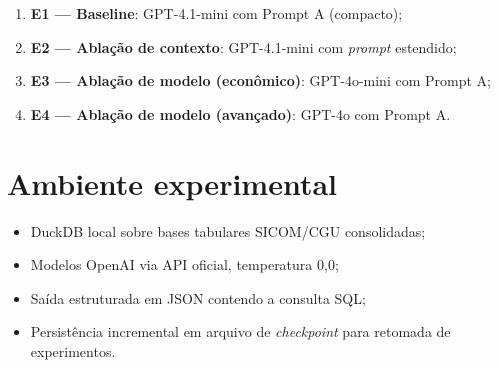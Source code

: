 \begin{enumerate}
    \item \textbf{E1 --- Baseline}: GPT-4.1-mini com Prompt A (compacto);
    \item \textbf{E2 --- Ablação de contexto}: GPT-4.1-mini com \textit{prompt} estendido;
    \item \textbf{E3 --- Ablação de modelo (econômico)}: GPT-4o-mini com Prompt A;
    \item \textbf{E4 --- Ablação de modelo (avançado)}: GPT-4o com Prompt A.
\end{enumerate}

\section{Ambiente experimental}

\begin{itemize}
    \item DuckDB local sobre bases tabulares SICOM/CGU consolidadas;
    \item Modelos OpenAI via API oficial, temperatura 0,0;
    \item Saída estruturada em JSON contendo a consulta SQL;
    \item Persistência incremental em arquivo de \textit{checkpoint} para retomada de experimentos.
\end{itemize}
